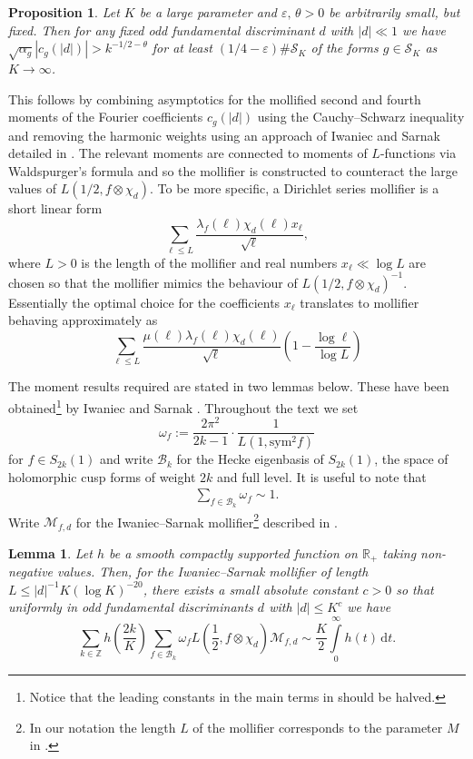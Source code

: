 \documentclass[a4paper,10pt,twoside]{amsart}
\newtheorem{lemma}[theorem]{Lemma}
\newtheorem{prop}[theorem]{Proposition}
\theoremstyle{definition}
\numberwithin{equation}{section}
\newcommand\Z{\mathbb{Z}}
\newcommand\eps{\varepsilon}
\renewcommand\:{\colon}
\begin{document}
\begin{prop}\label{non-vanishing}
Let $K$ be a large parameter and $\varepsilon,\,\theta>0$ be arbitrarily small, but fixed. Then for any fixed odd fundamental discriminant $d$ with $|d|\ll 1$ we have $\sqrt{\alpha_g}|c_g(|d|)|> k^{-1/2-\theta}$ for at least $(1/4-\eps)\#\mathcal S_K$ of the forms $g\in\mathcal S_K$ as $K\longrightarrow\infty$.
\end{prop}
\noindent This follows by combining asymptotics for the mollified second and fourth moments of the Fourier coefficients $c_g(|d|)$ using the Cauchy--Schwarz inequality and removing the harmonic weights using an approach of Iwaniec and Sarnak \cite{Iwaniec-Sarnak2000} detailed in \cite{Kowalski-Michel1999, Balkanova-Frolenkov2021}. The relevant moments are connected to moments of $L$-functions via Waldspurger's formula and so the mollifier is constructed to counteract the large values of $L(1/2,f\otimes \chi_d)$. To be more specific, a Dirichlet series mollifier is a short linear form
\[\sum_{\ell\leq L}\frac{\lambda_f(\ell)\chi_d(\ell)x_\ell}{\sqrt \ell},\]
where $L>0$ is the length of the mollifier and real numbers $x_\ell\ll\log L$ are chosen so that the mollifier mimics the behaviour of $L(1/2,f\otimes\chi_d)^{-1}$. Essentially the optimal choice for the coefficients $x_\ell$ translates to mollifier behaving approximately as
\[\sum_{\ell\leq L}\frac{\mu(\ell)\lambda_f(\ell)\chi_d(\ell)}{\sqrt\ell}\left(1-\frac{\log\ell}{\log L}\right)\]

The moment results required are stated in two lemmas below. These have been obtained\footnote{Notice that the leading constants in the main terms in \cite[Theorem 3]{Iwaniec-Sarnak2000} should be halved.} by Iwaniec and Sarnak \cite[Theorem 3]{Iwaniec-Sarnak2000}. Throughout the text we set
\[\omega_f:=\frac{2\pi^2}{2k-1}\cdot\frac1{L(1,\text{sym}^2f)}\]
for $f\in S_{2k}(1)$ and write $\mathcal B_k$ for the Hecke eigenbasis of $S_{2k}(1)$, the space of holomorphic cusp forms of weight $2k$ and full level. It is useful to note that  
\begin{align}\label{weights-average}
\sum_{f\in \mathcal B_k}\omega_f\sim 1. 
\end{align} 
Write $\mathcal M_{f,d}$ for the Iwaniec--Sarnak mollifier\footnote{In our notation the length $L$ of the mollifier corresponds to the parameter $M$ in \cite{Iwaniec-Sarnak2000}.} described in \cite[p. 163]{Iwaniec-Sarnak2000}.
 
\begin{lemma}\label{second-moment}
Let $h$ be a smooth compactly supported function on $\mathbb R_+$ taking non-negative values. Then, for the Iwaniec--Sarnak mollifier of length $L\leq |d|^{-1}K(\log K)^{-20}$, there exists a small absolute constant $c>0$ so that uniformly in odd fundamental discriminants $d$ with $|d|\leq K^c$ we have
\[\sum_{k\in\Z}h\left(\frac{2k}K\right)\sum_{f\in \mathcal B_k}\omega_f L\left(\frac12,f\otimes\chi_d\right)\mathcal M_{f,d}\sim \frac K2\int\limits_0^\infty h(t)\,\mathrm d t.\]
\end{lemma}
\end{document}
